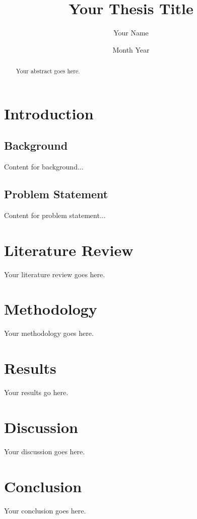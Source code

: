 \documentclass[12pt, a4paper]{report}
\begin{document}
\title{Your Thesis Title}
\author{Your Name}
\date{Month Year}
\maketitle

\begin{abstract}
Your abstract goes here.
\end{abstract}

\tableofcontents

\chapter{Introduction}
\section{Background}
Content for background...

\section{Problem Statement}
Content for problem statement...

\chapter{Literature Review}
Your literature review goes here.

\chapter{Methodology}
Your methodology goes here.

\chapter{Results}
Your results go here.

\chapter{Discussion}
Your discussion goes here.

\chapter{Conclusion}
Your conclusion goes here.

\printbibliography
\end{document}
